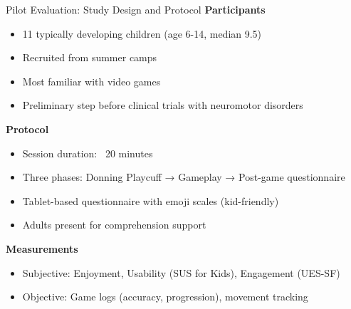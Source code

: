 \begin{frame}{Pilot Evaluation: Study Design and Protocol}
	\textbf{\textcolor{gbAqua}{Participants}}
	
	\begin{itemize}
		\item 11 typically developing children (age 6-14, median 9.5)
		\item Recruited from summer camps
		\item Most familiar with video games
		\item Preliminary step before clinical trials with neuromotor disorders
	\end{itemize}
	
	\vspace{0.3cm}
	
	\textbf{\textcolor{gbAqua}{Protocol}}
	
	\begin{itemize}
		\item Session duration: ~20 minutes
		\item Three phases: Donning Playcuff → Gameplay → Post-game questionnaire
		\item Tablet-based questionnaire with emoji scales (kid-friendly)
		\item Adults present for comprehension support
	\end{itemize}
	
	\vspace{0.3cm}
	
	\textbf{\textcolor{gbAqua}{Measurements}}
	
	\begin{itemize}
		\item Subjective: Enjoyment, Usability (SUS for Kids), Engagement (UES-SF)
		\item Objective: Game logs (accuracy, progression), movement tracking
	\end{itemize}
	
\end{frame}

